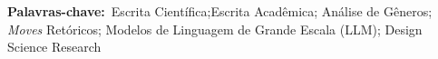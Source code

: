 
\textbf{Palavras-chave:}~Escrita Científica;Escrita Acadêmica; Análise de Gêneros; \textit{Moves}
Retóricos; Modelos de Linguagem de Grande Escala (LLM); Design Science Research
\newpage


\newpage

